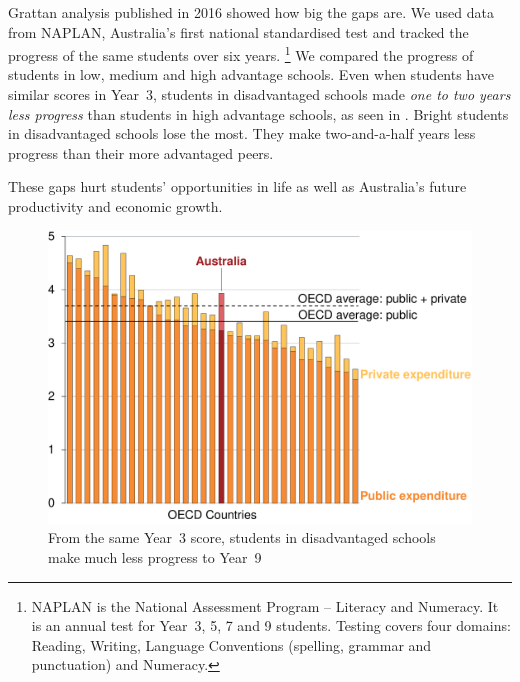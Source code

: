 \documentclass{grattan}
\begin{document}
Grattan analysis published in 2016 showed how big the gaps are.
We used data from NAPLAN, Australia's first national standardised test and tracked the progress of the same students over six years.%
\footnote{NAPLAN is the National Assessment Program -- Literacy and Numeracy.
It is an annual test for Year~3, 5, 7 and 9 students.
Testing covers four domains: Reading, Writing, Language Conventions (spelling, grammar and punctuation) and Numeracy.}
We compared the progress of students in low, medium and high advantage schools.
Even when students have similar scores in Year~3, students in disadvantaged schools made \emph{one to two years less progress} than students in high advantage schools, as seen in .
Bright students in disadvantaged schools lose the most.
They make two-and-a-half years less progress than their more advantaged peers.

These gaps hurt students' opportunities in life as well as Australia's future productivity and economic growth.

\begin{figure}
\caption{From the same Year~3 score, students in disadvantaged schools make much less progress to Year~9}\label{fig:widening-gaps}


\includegraphics[page=21]{atlas/Charts.pdf}

\end{figure}
\end{document}
